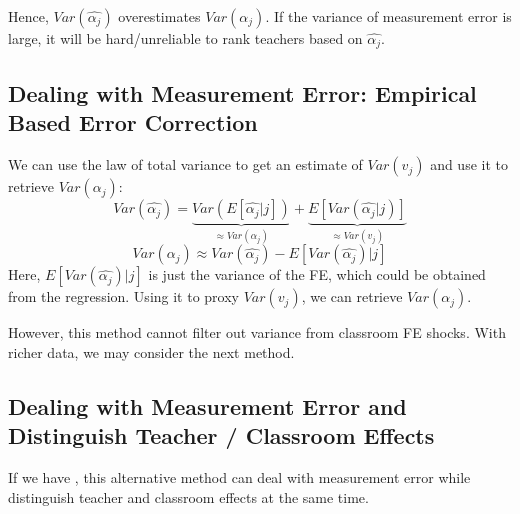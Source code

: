         Hence, $Var(\widehat{\alpha_j})$ overestimates $Var(\alpha_j)$. If the variance of measurement error is large, it will be hard/unreliable to rank teachers based on $\widehat{\alpha_j}$.

    \subsection{Dealing with Measurement Error: Empirical Based Error Correction}

        We can use the law of total variance to get an estimate of $Var(v_{j})$ and use it to retrieve $Var(\alpha_j)$:
        $$Var(\widehat{\alpha_j})=\underbrace{Var(E[\widehat{\alpha_j}|j])}_{\approx Var(\alpha_j)}+\underbrace{ E[Var(\widehat{\alpha_j}|j)] }_{ \approx Var(v_{j}) }$$
        $$Var(\alpha_j)\approx Var(\widehat{\alpha_j})-E[Var(\widehat{\alpha_j})|j]$$
        Here, $E[Var(\widehat{\alpha_j})|j]$ is just the variance of the FE, which could be obtained from the regression. Using it to proxy $Var(v_j)$, we can retrieve $Var(\alpha_j)$.
        
        However, this method cannot filter out variance from classroom FE shocks. With richer data, we may consider the next method.
        
    \subsection{Dealing with Measurement Error and Distinguish Teacher / Classroom Effects}

        If we have , this alternative method can deal with measurement error while distinguish teacher and classroom effects at the same time.

